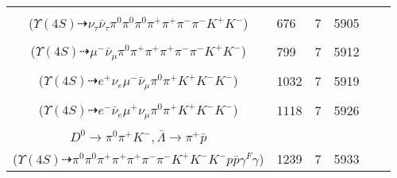\documentclass[landscape]{article}
\newcounter{rownumbers}
\newcommand\rn{\stepcounter{rownumbers}\arabic{rownumbers}}
\newcommand{\EOL}{\\} %
\newcommand{\topoTags}[1]{#1} %
\begin{document}
\begin{longtable}{clcccc}
\rn & \makecell[l]{ $ 
\Upsilon(4S) \rightarrow B^{0} \bar{B}^{0} ,
B^{0} \rightarrow \pi^{0} K^{+} K^{-} ,
\bar{B}^{0} \rightarrow \tau^{-} \bar{\nu}_{\tau} D^{*+} ,
\tau^{-} \rightarrow \nu_{\tau} \pi^{0} \pi^{-} ,
D^{*+} \rightarrow \pi^{+} D^{0} ,
D^{0} \rightarrow \pi^{0} \pi^{+} \pi^{-} 
$ \\ ($
\Upsilon(4S) \dashrightarrow \nu_{\tau} \bar{\nu}_{\tau} \pi^{0} \pi^{0} \pi^{0} \pi^{+} \pi^{+} \pi^{-} \pi^{-} K^{+} K^{-} 
$) } & \topoTags{676 & }7 & 5905 \EOL

\rn & \makecell[l]{ $ 
\Upsilon(4S) \rightarrow B^{0} \bar{B}^{0} ,
B^{0} \rightarrow \pi^{0} K^{+} K^{-} ,
\bar{B}^{0} \rightarrow \mu^{-} \bar{\nu}_{\mu} D^{*+} ,
D^{*+} \rightarrow \pi^{+} D^{0} ,
D^{0} \rightarrow \pi^{+} \pi^{-} K_{S}^{0} ,
K_{S}^{0} \rightarrow \pi^{+} \pi^{-} 
$ \\ ($
\Upsilon(4S) \dashrightarrow \mu^{-} \bar{\nu}_{\mu} \pi^{0} \pi^{+} \pi^{+} \pi^{+} \pi^{-} \pi^{-} K^{+} K^{-} 
$) } & \topoTags{799 & }7 & 5912 \EOL

\rn & \makecell[l]{ $ 
\Upsilon(4S) \rightarrow B^{0} \bar{B}^{0} ,
B^{0} \rightarrow \pi^{0} K^{+} K^{-} ,
\bar{B}^{0} \rightarrow \mu^{-} \bar{\nu}_{\mu} D^{+} ,
D^{+} \rightarrow e^{+} \nu_{e} \bar{K}^{*} ,
\bar{K}^{*} \rightarrow \pi^{+} K^{-} 
$ \\ ($
\Upsilon(4S) \dashrightarrow e^{+} \nu_{e} \mu^{-} \bar{\nu}_{\mu} \pi^{0} \pi^{+} K^{+} K^{-} K^{-} 
$) } & \topoTags{1032 & }7 & 5919 \EOL

\rn & \makecell[l]{ $ 
\Upsilon(4S) \rightarrow B^{0} \bar{B}^{0} ,
B^{0} \rightarrow \pi^{0} K^{+} K^{-} ,
\bar{B}^{0} \rightarrow e^{-} \bar{\nu}_{e} D^{+} ,
D^{+} \rightarrow \mu^{+} \nu_{\mu} \bar{K}^{*} ,
\bar{K}^{*} \rightarrow \pi^{+} K^{-} 
$ \\ ($
\Upsilon(4S) \dashrightarrow e^{-} \bar{\nu}_{e} \mu^{+} \nu_{\mu} \pi^{0} \pi^{+} K^{+} K^{-} K^{-} 
$) } & \topoTags{1118 & }7 & 5926 \EOL

\rn & \makecell[l]{ $ 
\Upsilon(4S) \rightarrow B^{0} \bar{B}^{0} ,
B^{0} \rightarrow \pi^{0} K^{+} K^{-} \gamma^{F} ,
\bar{B}^{0} \rightarrow \pi^{-} D^{*+} \Lambda \bar{\Sigma}^{0} ,
D^{*+} \rightarrow \pi^{+} D^{0} ,
\Lambda \rightarrow \pi^{-} p ,
\bar{\Sigma}^{0} \rightarrow \bar{\Lambda} \gamma ,
$ \\ $
D^{0} \rightarrow \pi^{0} \pi^{+} K^{-} ,
\bar{\Lambda} \rightarrow \pi^{+} \bar{p} 
$ \\ ($
\Upsilon(4S) \dashrightarrow \pi^{0} \pi^{0} \pi^{+} \pi^{+} \pi^{+} \pi^{-} \pi^{-} K^{+} K^{-} K^{-} p \bar{p} \gamma^{F} \gamma 
$) } & \topoTags{1239 & }7 & 5933 \EOL


\end{longtable}
\end{document}

